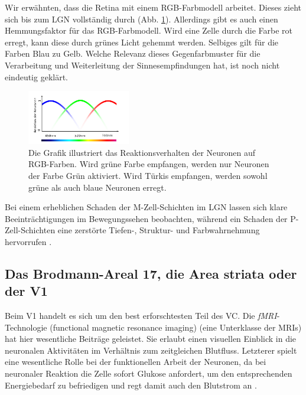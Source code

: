 \documentclass[12pt,a4paper]{article}
\newcommand{\fwex}[1]{\textit{#1}}
\newcommand{\fig}[1]{Abb. #1}
\begin{document}
Wir erwähnten, dass die Retina mit einem RGB-Farbmodell arbeitet. Dieses zieht
sich bis zum LGN vollständig durch (\fig{\ref{img:rgb_reaction}}). Allerdings
gibt es auch einen Hemmungsfaktor für das RGB-Farbmodell. Wird eine Zelle
durch die Farbe rot erregt, kann diese durch grünes Licht gehemmt werden.
Selbiges gilt für die Farben Blau zu Gelb. Welche Relevanz dieses
Gegenfarbmuster für die Verarbeitung und Weiterleitung der Sinnesempfindungen
hat, ist noch nicht eindeutig geklärt.

\begin{figure}[h]
  \begin{center}
    \includegraphics[width=0.4\textwidth]{imgs/rgb_neuronal_reaction.pdf}
    \caption[Reaktionsverhalten der Neuronen auf RGB-Farben]
     {Die Grafik illustriert das Reaktionsverhalten der Neuronen
      auf RGB-Farben. Wird grüne Farbe empfangen, werden nur Neuronen der
      Farbe Grün aktiviert. Wird Türkis empfangen, werden sowohl grüne
      als auch blaue Neuronen erregt.}
    \label{img:rgb_reaction}
  \end{center}
\end{figure}

Bei einem erheblichen Schaden der M-Zell-Schichten im LGN lassen sich klare
Beeinträchtigungen im Bewegungssehen beobachten, während ein Schaden der
P-Zell-Schichten eine zerstörte Tiefen-, Struktur- und Farbwahrnehmung
hervorrufen \cite{schiller}.

\subsection{Das Brodmann-Areal 17, die Area striata oder der V1}

Beim V1 handelt es sich um den best erforschtesten Teil des VC. Die
\fwex{fMRI}-Technologie (functional magnetic resonance imaging) (eine
Unterklasse der MRIs) hat hier wesentliche Beiträge geleistet. Sie erlaubt
einen visuellen Einblick in die neuronalen Aktivitäten im Verhältnis zum
zeitgleichen Blutfluss. Letzterer spielt eine wesentliche Rolle bei der
funktionellen Arbeit der Neuronen, da bei neuronaler Reaktion die Zelle
sofort Glukose anfordert, um den entsprechenden Energiebedarf zu befriedigen
und regt damit auch den Blutstrom an \cite{brainactivation}.
\end{document}
